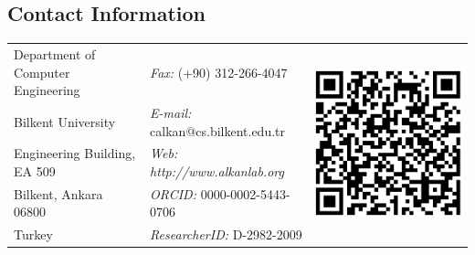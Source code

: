 \documentclass[margin,line]{res}
\begin{document}

\begin{resume}

  \section{\sc Contact Information}
  \vspace{.05in}
  \begin{tabular}{@{}p{2.5in}p{2.3in}p{1in}}
 Department of Computer Engineering & {\it Fax:}    (+90) 312-266-4047  & \multirow{5}{*}{\includegraphics[scale=0.15]{calkan_orcid.png}}\\            
    Bilkent University   & {\it E-mail:}  calkan@cs.bilkent.edu.tr & \\         
    Engineering Building, EA 509   & {\it Web: http://www.alkanlab.org} &\\        
    Bilkent, Ankara 06800 & {\it ORCID: } 0000-0002-5443-0706 &\\ 
    Turkey & {\it ResearcherID: } D-2982-2009 &\\ 
  \end{tabular}


\end{resume}
\end{document}
